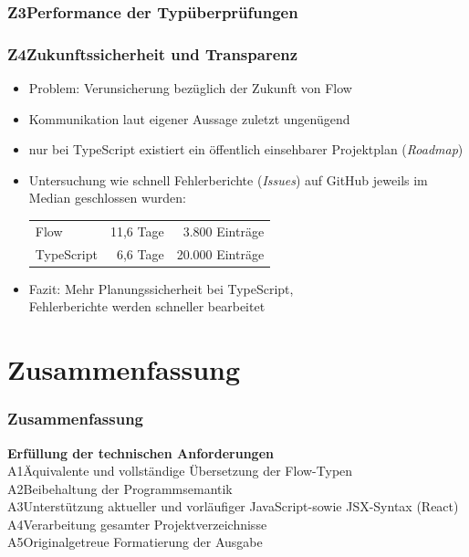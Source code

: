       \begin{frame}
        \frametitle{Z3\hspace{0.75em}Performance der Typüberprüfungen}
      \end{frame}

      \begin{frame}
        \frametitle{Z4\hspace{0.75em}Zukunftssicherheit und Transparenz}
        \begin{itemize}
          \item Problem: Verunsicherung bezüglich der Zukunft von Flow
          \item Kommunikation laut eigener Aussage zuletzt ungenügend~\autocite{FLOW:UPDATE_2019}
          \item nur bei TypeScript existiert ein öffentlich einsehbarer Projektplan (\textit{Roadmap})
          \item Untersuchung wie schnell Fehlerberichte (\textit{Issues}) auf GitHub jeweils im Median geschlossen wurden:\\
            \medskip
            {
              \footnotesize
              \begin{tabu}{@{}lrr@{}}
                \midrule
                Flow & 11,6 Tage & 3.800 Einträge \\
                TypeScript & 6,6 Tage & 20.000 Einträge \\
                \midrule
              \end{tabu}
            }
          \item Fazit: Mehr Planungssicherheit bei TypeScript,\\Fehlerberichte werden schneller bearbeitet
        \end{itemize}
      \end{frame}

  \section{Zusammenfassung}

    \begin{frame}
      \frametitle{Zusammenfassung}
      \textbf{Erfüllung der technischen Anforderungen}\\[1em]
      A1\hspace{0.75em}Äquivalente und vollständige Übersetzung der Flow-Typen\\[.6em]
      A2\hspace{0.75em}Beibehaltung der Programmsemantik\\[.6em]
      A3\hspace{0.75em}Unterstützung aktueller und vorläufiger JavaScript-\secframebr sowie JSX-Syntax (React)\\[.6em]
      A4\hspace{0.75em}Verarbeitung gesamter Projektverzeichnisse\\[.6em]
      A5\hspace{0.75em}Originalgetreue Formatierung der Ausgabe
    \end{frame}

